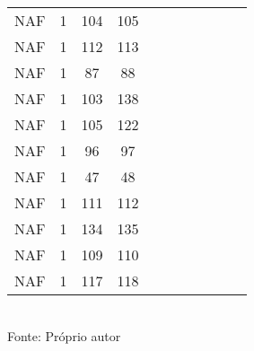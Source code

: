 \begin{table}[H]
{\begin{tabular}{ccccccccccc}
NAF & 1 & 104 & 105 &  &  &  &  &  &  &  \\
NAF & 1 & 112 & 113 &  &  &  &  &  &  &  \\
NAF & 1 & 87 & 88 &  &  &  &  &  &  &  \\
NAF & 1 & 103 & 138 &  &  &  &  &  &  &  \\
NAF & 1 & 105 & 122 &  &  &  &  &  &  &  \\
NAF & 1 & 96 & 97 &  &  &  &  &  &  &  \\
NAF & 1 & 47 & 48 &  &  &  &  &  &  &  \\
NAF & 1 & 111 & 112 &  &  &  &  &  &  &  \\
NAF & 1 & 134 & 135 &  &  &  &  &  &  &  \\
NAF & 1 & 109 & 110 &  &  &  &  &  &  &  \\
NAF & 1 & 117 & 118 &  &  &  &  &  &  &  \\
\bottomrule
\end{tabular}}
\\Fonte: Próprio autor
\end{table}


